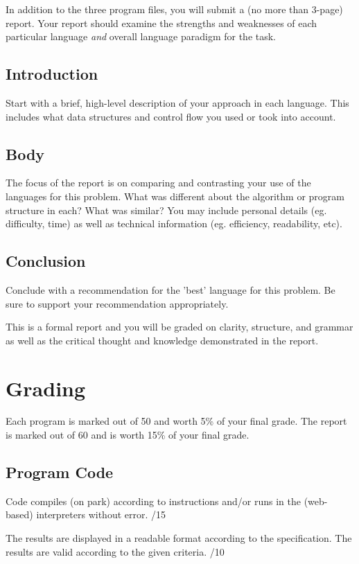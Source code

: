 \documentclass[12pt,info]{asg}
\begin{document}
In addition to the three program files, you will submit a (no more than 3-page) report. Your report should examine the strengths and weaknesses of each particular language {\em and} overall language paradigm for the task. 

\subsection*{Introduction}
Start with a brief, high-level description of your approach in each language. This includes what data structures and control flow you used or took into account.

\subsection*{Body}
The focus of the report is on comparing and contrasting your use of the languages for this problem. What was different about the algorithm or program structure in each? What was similar? You may include personal details (eg. difficulty, time) as well as technical information (eg. efficiency, readability, etc).

\subsection*{Conclusion}
Conclude with a recommendation for the 'best' language for this problem. Be sure to support your recommendation appropriately.

This is a formal report and you will be graded on clarity, structure, and grammar as well as the critical thought and  knowledge demonstrated in the report.


\section*{Grading}

Each program is marked out of 50 and worth 5\% of your final grade. The report is marked out of 60 and is worth 15\% of your final grade.

\subsection*{Program Code}
Code compiles (on park) according to instructions and/or runs in the (web-based) interpreters without error. /15

The results are displayed in a readable format according to the specification. The results are valid according to the given criteria. /10
\end{document}
